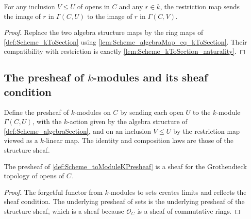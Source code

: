 \begin{lemma}\leanok
  \label{lem:Scheme_algebraMap_naturality}

  For any inclusion \(V \le U\) of opens in \(C\) and any \(r \in k\), the restriction map sends the image of \(r\) in \(\Gamma(C, U)\) to the image of \(r\) in \(\Gamma(C, V)\).
\end{lemma}

\begin{proof}

  \leanok
  Replace the two algebra structure maps by the ring maps of \cref{def:Scheme_kToSection} using \cref{lem:Scheme_algebraMap_eq_kToSection}. Their compatibility with restriction is exactly \cref{lem:Scheme_kToSection_naturality}.
\end{proof}

\subsection{The presheaf of \(k\)-modules and its sheaf condition}

\begin{definition}\leanok
  \label{def:Scheme_toModuleKPresheaf}

  Define the presheaf of \(k\)-modules on \(C\) by sending each open \(U\) to the \(k\)-module \(\Gamma(C, U)\), with the \(k\)-action given by the algebra structure of \cref{def:Scheme_algebraSection}, and on an inclusion \(V \le U\) by the restriction map viewed as a \(k\)-linear map. The identity and composition laws are those of the structure sheaf.
\end{definition}

\begin{theorem}\leanok
  \label{thm:Scheme_toModuleKPresheaf_isSheaf}

  The presheaf of \cref{def:Scheme_toModuleKPresheaf} is a sheaf for the Grothendieck topology of opens of \(C\).
\end{theorem}

\begin{proof}

  \leanok
  The forgetful functor from \(k\)-modules to sets creates limits and reflects the sheaf condition. The underlying presheaf of sets is the underlying presheaf of the structure sheaf, which is a sheaf because \(\mathcal O_C\) is a sheaf of commutative rings.
\end{proof}

